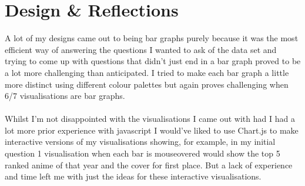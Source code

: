 \documentclass[a4paper]{article}
\begin{document}
		
	\section* {Design \& Reflections}
	A lot of my designs came out to being bar graphs purely because it was the most efficient way of answering the questions I wanted to ask of the data set and trying to come up with questions that didn't just end in a bar graph proved to be a lot more challenging than anticipated. I tried to make each bar graph a little more distinct using different colour palettes but again proves challenging when 6/7 visualisations are bar graphs.\\
	\\
	Whilst I'm not disappointed with the visualisations I came out with had I had a lot more prior experience with javascript I would've liked to use Chart.js to make interactive versions of my visualisations showing, for example, in my initial question 1 visualisation when each bar is mouseovered would show the top 5 ranked anime of that year and the cover for first place. But a lack of experience and time left me with just the ideas for these interactive visualisations.\\
	\\
	
\end{document}
